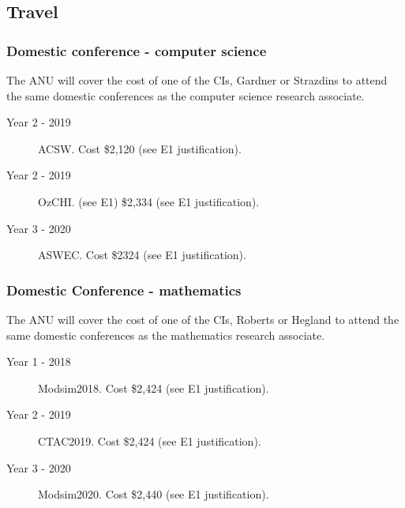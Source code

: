 \documentclass[a4paper,fontsize=12pt]{scrartcl}
\begin{document}
\subsection*{Travel}

\subsubsection*{Domestic conference - computer science}

The ANU will cover the cost of one of the CIs, Gardner or Strazdins 
to attend the  same domestic conferences as the computer science 
research associate. 


\begin{description}
\item[Year 2 - 2019] ACSW. Cost \$2,120  (see E1 justification).

\item[Year 2 - 2019] OzCHI. (see E1) \$2,334 (see E1 justification).

\item[Year 3 -  2020] ASWEC.  Cost \$2324 (see E1 justification).

\end{description}

\subsubsection*{Domestic Conference - mathematics}

The ANU will cover the cost of one of the CIs, Roberts or Hegland 
to attend the  same domestic conferences as the mathematics 
research associate. 


\begin{description}
\item[Year 1 - 2018] Modsim2018. Cost \$2,424  (see E1 justification).

\item[Year 2 - 2019] CTAC2019. Cost \$2,424  (see E1 justification).

\item[Year 3 - 2020] Modsim2020.  Cost \$2,440  (see E1 justification).


\end{description}
\end{document}
